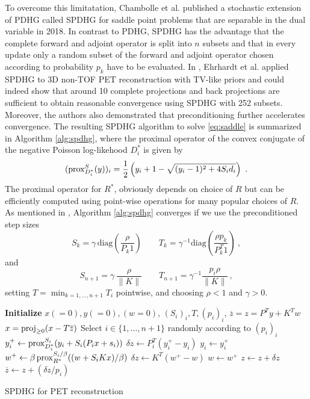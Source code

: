 To overcome this limitatation, Chambolle et al. published a stochastic extension of PDHG called SPDHG 
for saddle point problems that are separable in the dual variable \cite{Chambolle2018} in 2018.
In contrast to PDHG, SPDHG has the advantage that the complete forward and adjoint operator is 
split into $n$ subsets and that in every update only a random subset of the forward
and adjoint operator chosen according to probability $p_k$ have to be evaluated.
In \cite{Ehrhardt2019}, Ehrhardt et al. applied SPDHG to 3D non-TOF PET reconstruction with TV-like
priors and could indeed show that around 10 complete projections and back projections are sufficient 
to obtain reasonable convergence using SPDHG with 252 subsets.
Moreover, the authors also demonstrated that preconditioning further accelerates convergence.
The resulting SPDHG algorithm to solve \eqref{eq:saddle} is summarized in Algorithm \ref{alg:spdhg},
where the proximal operator of the convex conjugate of the negative Poisson log-likehood $D_i^*$ 
is given by
%
\begin{equation}
(\operatorname{prox}_{D_i^*}^{S}(y))_i = \frac{1}{2} \left(y_i + 1 - \sqrt{ (y_i-1)^2 + 4 S_i d_i} \right) \ .
\label{eq:proxD}
\end{equation} 
%
The proximal operator for $R^*$, obviously depends on choice of $R$ but can be efficiently 
computed using point-wise operations for many popular choices of $R$.
As mentioned in \cite{Ehrhardt2019}, Algorithm \ref{alg:spdhg} converges if we use the preconditioned
step sizes
%
\[ S_k = \gamma \, \text{diag}(\frac{\rho}{P_k 1} )\qquad  T_k = \gamma^{-1} \text{diag}(\frac{\rho p_k}{P^T_k 1}) \ , \]
% 
and
%
\[ S_{n+1} = \gamma \, \frac{\rho}{\|K\|} \qquad T_{n+1} = \gamma^{-1} \frac{p_i\rho}{\|K\|} \ , \]
%
setting $T = \min_{k=1,\ldots,n+1} T_i$ pointwise, and choosing $\rho<1$ and $\gamma>0$.

%
%
%
%
%
\begin{algorithm}[t]
\begin{algorithmic}[1]
\small
\State \textbf{Initialize} $x(=0),y(=0),(w=0)$, $(S_i)_i,T,(p_i)_i$,
\State $\overline{z} = z = P^T y + K^T w$
\Repeat
	\State $x = \operatorname{proj}_{\geq 0} (x - T \overline{z})$
	\State Select $i \in \{ 1,\ldots,n+1\} $ randomly according to $(p_i)_i$
	\State $y_i^+ \gets \operatorname{prox}_{D_i^*}^{S_i} ( y_i + S_i  ( P_i x + s_i))$
	\State $\delta z \gets P_i^T (y_i^+ - y_i)$
	\State $y_i \gets y_i^+$
  \Else
	\State $w^+ \gets \beta \operatorname{prox}_{R^*}^{S_i/\beta} ((w + S_i  K x)/\beta)$
	\State $\delta z \gets K^T (w^+ - w)$
	\State $w \gets w^+$
  \EndIf
	\State $z \gets z + \delta z$
	\State $\overline{z} \gets  z + (\delta z/p_i)$
\State {}
\end{algorithmic}
\caption{SPDHG for PET reconstruction \cite{Ehrhardt2019}}
\label{alg:spdhg}
\end{algorithm}
%
%
%

